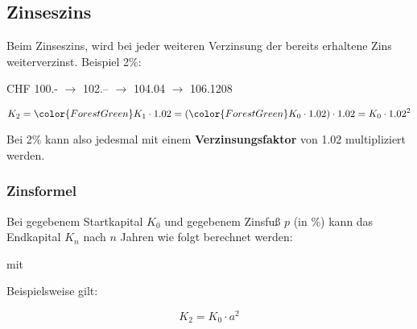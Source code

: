 
\subsection{Zinseszins}



Beim Zinseszins, wird bei jeder weiteren Verzinsung der bereits
erhaltene Zins weiterverzinst. Beispiel 2\%:



CHF 100.- $\rightarrow$ 102.-- $\rightarrow$ 104.04 $\rightarrow$
106.1208

$$K_2 = {\color{ForestGreen}K_1}\cdot{}1.02 = ({\color{ForestGreen}K_0\cdot{}1.02})\cdot{}1.02 = K_0\cdot{}1.02^2$$

Bei 2\% kann also jedesmal mit einem \textbf{Verzinsungsfaktor} von
1.02 multipliziert werden.


\subsubsection{Zinsformel}

Bei gegebenem Startkapital $K_0$ und gegebenem Zinsfuß $p$ (in \%) kann das Endkapital $K_n$ nach $n$ Jahren wie folgt berechnet werden:

\begin{center}\end{center}

mit

\begin{center}\end{center}

Beispielsweise gilt:

$$K_2 = K_0 \cdot{} a^2$$


